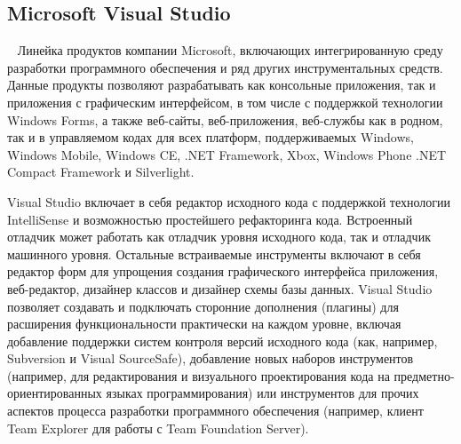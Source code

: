 \subsection{Microsoft Visual Studio}~
Линейка продуктов компании Microsoft, включающих интегрированную среду разработки программного обеспечения и ряд других инструментальных средств. Данные продукты позволяют разрабатывать как консольные приложения, так и приложения с графическим интерфейсом, в том числе с поддержкой технологии Windows Forms, а также веб-сайты, веб-приложения, веб-службы как в родном, так и в управляемом кодах для всех платформ, поддерживаемых Windows, Windows Mobile, Windows CE, .NET Framework, Xbox, Windows Phone .NET Compact Framework и Silverlight.

Visual Studio включает в себя редактор исходного кода с поддержкой технологии IntelliSense и возможностью простейшего рефакторинга кода. Встроенный отладчик может работать как отладчик уровня исходного кода, так и отладчик машинного уровня. Остальные встраиваемые инструменты включают в себя редактор форм для упрощения создания графического интерфейса приложения, веб-редактор, дизайнер классов и дизайнер схемы базы данных. Visual Studio позволяет создавать и подключать сторонние дополнения (плагины) для расширения функциональности практически на каждом уровне, включая добавление поддержки систем контроля версий исходного кода (как, например, Subversion и Visual SourceSafe), добавление новых наборов инструментов (например, для редактирования и визуального проектирования кода на предметно-ориентированных языках программирования) или инструментов для прочих аспектов процесса разработки программного обеспечения (например, клиент Team Explorer для работы с Team Foundation Server).